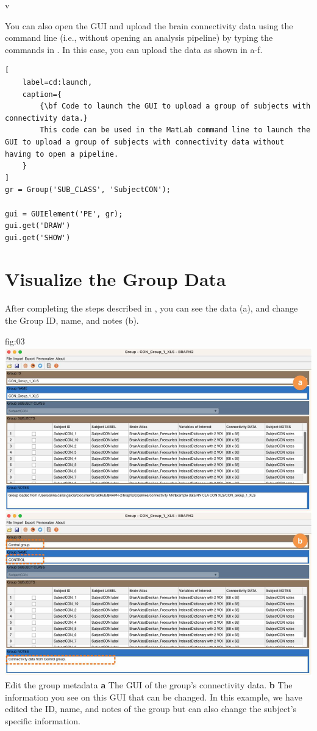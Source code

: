 v\documentclass[justified]{tufte-handout}
\begin{document}

\begin{tcolorbox}[
	title=GUI launch from command line
]
You can also open the GUI and upload the brain connectivity data using the command line (i.e., without opening an analysis pipeline) by typing the commands in . In this case, you can upload the data as shown in a-f.

\begin{lstlisting}[
	label=cd:launch,
	caption={
		{\bf Code to launch the GUI to upload a group of subjects with connectivity data.}
		This code can be used in the MatLab command line to launch the GUI to upload a group of subjects with connectivity data without having to open a pipeline.
	}
]
gr = Group('SUB_CLASS', 'SubjectCON');

gui = GUIElement('PE', gr);
gui.get('DRAW')
gui.get('SHOW')
\end{lstlisting}
\end{tcolorbox}

\section{Visualize the Group Data}

After completing the steps described in , you can see the data (a), and change the Group ID, name, and notes (b). 

	{fig:03}
	{
	\includegraphics{fig03.jpg}
	}
	{Edit the group metadata}
	{ 
	{\bf a} The GUI of the group's connectivity data. 
	{\bf b} The information you see on this GUI that can be changed. In this example, we have edited the ID, name, and notes of the group but can also change the subject's specific information.
	}
\end{document}
